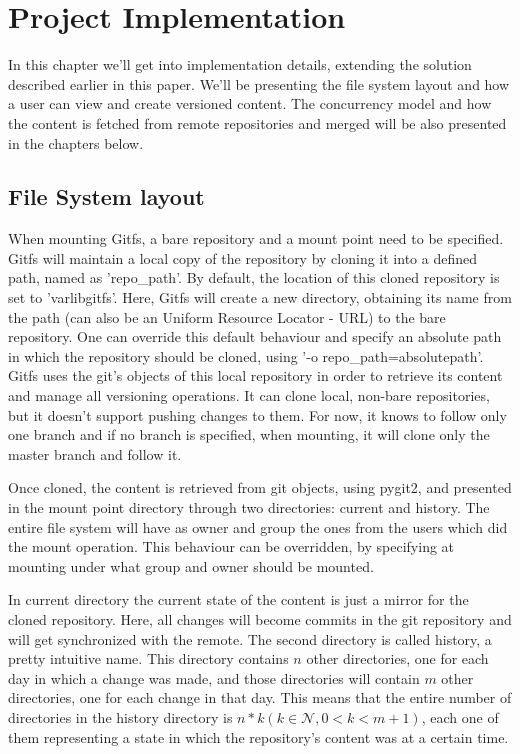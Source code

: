 \chapter{Project Implementation}

\label{ch:fslayout}

In this chapter we'll get into implementation details, extending the solution described earlier in this paper. We'll be presenting the file system layout and how a user can view and create versioned content. The concurrency model and how the content is fetched from remote repositories and merged will be also presented in the chapters below.

\section{File System layout}
When mounting Gitfs, a bare repository and a mount point need to be specified. Gitfs will maintain a local copy of the repository by cloning it into a defined path, named as 'repo\_path'. By default, the location of this cloned repository is set to '\/var\/lib\/gitfs'. Here, Gitfs will create a new directory, obtaining its name from the path (can also be an Uniform Resource Locator - URL) to the bare repository. One can override this default behaviour and specify an absolute path in which the repository should be cloned, using '-o repo\_path=\/absolute\/path\/'. Gitfs uses the git's objects of this local repository in order to retrieve its content and manage all versioning operations. It can clone local, non-bare repositories, but it doesn't support pushing changes to them. For now, it knows to follow only one branch and if no branch is specified, when mounting, it will clone only the master branch and follow it.

Once cloned, the content is retrieved from git objects, using pygit2, and presented in the mount point directory through two directories: current and history. The entire file system will have as owner and group the ones from the users which did the mount operation. This behaviour can be overridden, by specifying at mounting under what group and owner should be mounted.

In current directory the current state of the content is just a mirror for the cloned repository. Here, all changes will become commits in the git repository and will get synchronized with the remote. The second directory is called history, a pretty intuitive name. This directory contains $n$ other directories, one for each day in which a change was made, and those directories will contain $m$ other directories, one for each change in that day. This means that the entire number of directories in the history directory is $n*k (k \in \mathcal{N}, 0<k<m+1)$, each one of them representing a state in which the repository's content was at a certain time.

